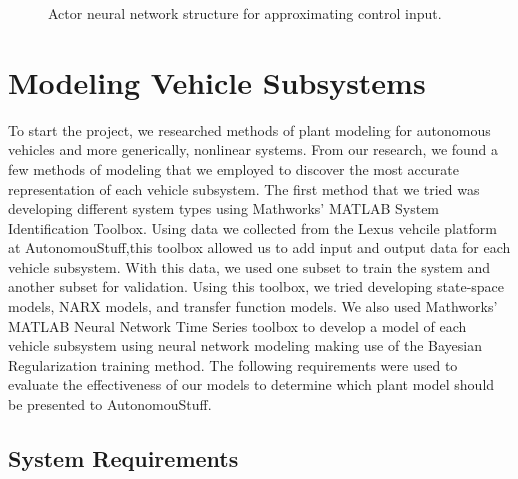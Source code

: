 \documentclass[journal,twoside,web]{ieeecolor}
\begin{document}
\begin{figure}
  \caption{Actor neural network structure for approximating control input.}
  \label{fig:nnActor}
\end{figure}


 
 

\section{Modeling Vehicle Subsystems}

To start the project, we researched methods of plant modeling for autonomous vehicles and more generically, nonlinear systems. From our research, we found a few methods of modeling that we employed to discover the most accurate representation of each vehicle subsystem. The first method that we tried was developing different system types using Mathworks' MATLAB System Identification Toolbox. Using data we collected from the Lexus vehcile platform at AutonomouStuff,this toolbox allowed us to add input and output data for each vehicle subsystem. With this data, we used one subset to train the system and another subset for validation. Using this toolbox, we tried developing state-space models, NARX models, and transfer function models. We also used Mathworks' MATLAB Neural Network Time Series toolbox to develop a model of each vehicle subsystem using neural network modeling making use of the Bayesian Regularization training method. The following requirements were used to evaluate the effectiveness of our models to determine which plant model should be presented to AutonomouStuff.


\subsection{System Requirements}
\end{document}
